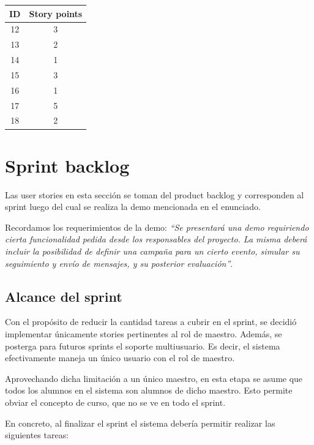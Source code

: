 \documentclass[a4paper, 10pt, twoside]{article}
\begin{document}
\begin{center}
\begin{tabular}{|c|c|}
\hline
ID & Story points\\
\hline
12 & 3\\
13 & 2\\
14 & 1\\
15 & 3\\
16 & 1\\
17 & 5\\
18 & 2\\
\hline
\end{tabular}
\end{center}




\newpage
\section{Sprint backlog}

Las user stories en esta sección se toman del product backlog y corresponden al sprint luego del cual se realiza la demo mencionada en el enunciado.

Recordamos los requerimientos de la demo: \emph{``Se presentará una demo requiriendo cierta funcionalidad pedida desde los responsables del proyecto. La misma deberá incluir la posibilidad de definir una campaña para un cierto evento, simular su seguimiento y envío de mensajes, y su posterior evaluación''}.


\subsection{Alcance del sprint}

Con el propósito de reducir la cantidad tareas a cubrir en el sprint, se decidió implementar únicamente stories pertinentes al rol de maestro. Además, se posterga para futuros sprints el soporte multiusuario. Es decir, el sistema efectivamente maneja un único usuario con el rol de maestro.

Aprovechando dicha limitación a un único maestro, en esta etapa se asume que todos los alumnos en el sistema son alumnos de dicho maestro. Esto permite obviar el concepto de curso, que no se ve en todo el sprint.

En concreto, al finalizar el sprint el sistema debería permitir realizar las siguientes tareas:
\end{document}
